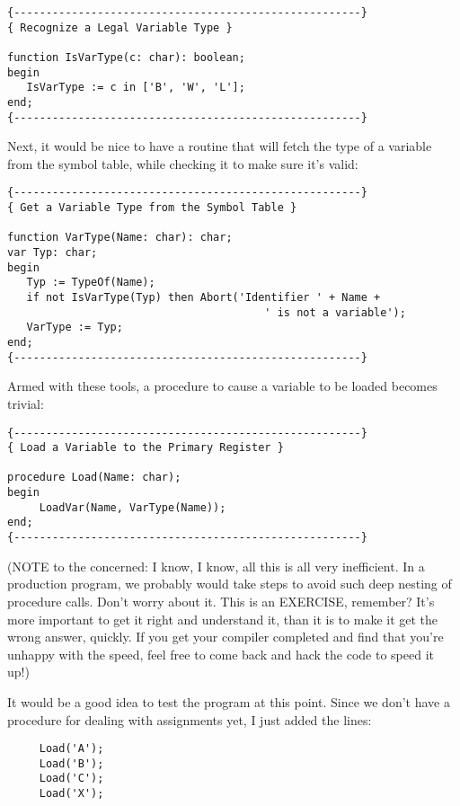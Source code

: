 \begin{verbatim}
{------------------------------------------------------}
{ Recognize a Legal Variable Type }

function IsVarType(c: char): boolean;
begin
   IsVarType := c in ['B', 'W', 'L'];
end;
{------------------------------------------------------}
\end{verbatim}

Next, it would be nice to have a routine that will fetch the type of a variable from the symbol table, while checking  it  to  make sure it's valid:

\begin{verbatim}
{------------------------------------------------------}
{ Get a Variable Type from the Symbol Table }

function VarType(Name: char): char;
var Typ: char;
begin
   Typ := TypeOf(Name);
   if not IsVarType(Typ) then Abort('Identifier ' + Name +
                                        ' is not a variable');
   VarType := Typ;
end;
{------------------------------------------------------}
\end{verbatim}

Armed with these  tools, a  procedure  to cause a variable to be loaded becomes trivial:

\begin{verbatim}
{------------------------------------------------------}
{ Load a Variable to the Primary Register }

procedure Load(Name: char);
begin
     LoadVar(Name, VarType(Name));
end;
{------------------------------------------------------}
\end{verbatim}

(NOTE to the  concerned:  I  know, I  know, all this is all very inefficient. In a production  program, we  probably  would take steps to avoid such deep nesting of procedure calls. Don't worry about it. This is an EXERCISE, remember?  It's more important to get it  right  and  understand  it, than it is to make it get the wrong  answer, quickly. If you get your compiler completed and find that you're unhappy  with  the speed, feel free to come back and hack the code to speed it up!)

It would be a good idea to test the program at this point. Since we don't have a  procedure  for  dealing  with assignments yet, I just added the lines:

\begin{verbatim}
     Load('A');
     Load('B');
     Load('C');
     Load('X');
\end{verbatim}

